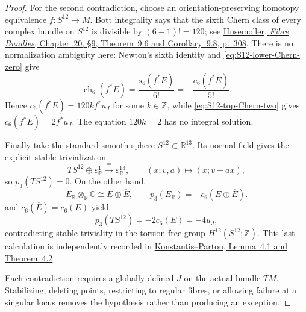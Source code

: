 \documentclass[11pt,letterpaper]{article}
\numberwithin{equation}{section}
\theoremstyle{definition}
\theoremstyle{remark}
\newcommand{\R}{\mathbb R}
\newcommand{\C}{\mathbb C}
\newcommand{\Z}{\mathbb Z}
\begin{document}
\begin{proof}
For the second contradiction, choose an orientation-preserving homotopy
equivalence \(f:S^{12}\to M\).  Bott integrality says that the sixth Chern
class of every complex bundle on \(S^{12}\) is divisible by
\((6-1)!=120\); see
\href{https://doi.org/10.1007/978-1-4757-2261-1}{Husemoller,
\emph{Fibre Bundles}, Chapter~20, \S9, Theorem~9.6 and
Corollary~9.8, p.~308}.  There is no normalization ambiguity here:
Newton's sixth identity and \cref{eq:S12-lower-Chern-zero} give
\[
 \operatorname{ch}_6(f^*E)
 =\frac{s_6(f^*E)}{6!}
 =-\frac{c_6(f^*E)}{5!}.
\]
Hence \(c_6(f^*E)=120k f^*u_J\) for some \(k\in\Z\), while
\cref{eq:S12-top-Chern-two} gives
\(c_6(f^*E)=2f^*u_J\).  The equation \(120k=2\) has no integral solution.

Finally take the standard smooth sphere
\(S^{12}\subset\R^{13}\).  Its normal field gives the explicit stable
trivialization
\begin{equation}
 TS^{12}\oplus\varepsilon^1_{\R}
 \xrightarrow{\ \cong\ }\varepsilon^{13}_{\R},
 \qquad (x;v,a)\longmapsto(x;v+ax),
 \label{eq:S12-stable-trivialization}
\end{equation}
so \(p_3(TS^{12})=0\).  On the other hand,
\[
 E_{\R}\otimes_{\R}\C\cong E\oplus\overline E,
 \qquad p_3(E_{\R})=-c_6(E\oplus\overline E).
\]
 and
\(c_6(\overline E)=c_6(E)\) yield
\begin{equation}
 p_3(TS^{12})=-2c_6(E)=-4u_J,
 \label{eq:S12-Pontryagin-contradiction}
\end{equation}
contradicting stable triviality in the torsion-free group
\(H^{12}(S^{12};\Z)\).  This last calculation is independently recorded
in
\href{https://doi.org/10.1016/j.difgeo.2017.10.010}{Konstantis--Parton,
Lemma~4.1 and Theorem~4.2}.

Each contradiction requires a globally defined \(J\) on the actual bundle
\(TM\).  Stabilizing, deleting points, restricting to regular fibres, or
allowing failure at a singular locus removes the hypothesis rather than
producing an exception.
\end{proof}
\end{document}

